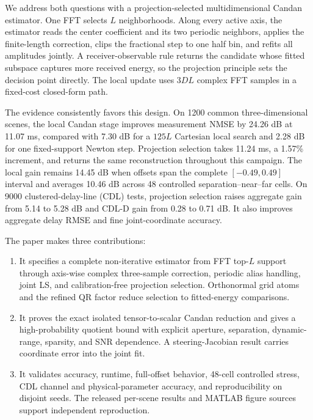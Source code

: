 We address both questions with a projection-selected multidimensional Candan estimator. One FFT selects $L$ neighborhoods. Along every active axis, the estimator reads the center coefficient and its two periodic neighbors, applies the finite-length correction, clips the fractional step to one half bin, and refits all amplitudes jointly. A receiver-observable rule returns the candidate whose fitted subspace captures more received energy, so the projection principle sets the decision point directly. The local update uses $3DL$ complex FFT samples in a fixed-cost closed-form path.

The evidence consistently favors this design. On 1200 common three-dimensional scenes, the local Candan stage improves measurement NMSE by 24.26 dB at 11.07 ms, compared with 7.30 dB for a $125L$ Cartesian local search and 2.28 dB for one fixed-support Newton step. Projection selection takes 11.24 ms, a 1.57\% increment, and returns the same reconstruction throughout this campaign. The local gain remains 14.45 dB when offsets span the complete $[-0.49,0.49]$ interval and averages 10.46 dB across 48 controlled separation--near--far cells. On 9000 clustered-delay-line (CDL) tests, projection selection raises aggregate gain from 5.14 to 5.28 dB and CDL-D gain from 0.28 to 0.71 dB. It also improves aggregate delay RMSE and fine joint-coordinate accuracy.

The paper makes three contributions:
\begin{enumerate}
  \item It specifies a complete non-iterative estimator from FFT top-$L$ support through axis-wise complex three-sample correction, periodic alias handling, joint LS, and calibration-free projection selection. Orthonormal grid atoms and the refined QR factor reduce selection to fitted-energy comparisons.
  \item It proves the exact isolated tensor-to-scalar Candan reduction and gives a high-probability quotient bound with explicit aperture, separation, dynamic-range, sparsity, and SNR dependence. A steering-Jacobian result carries coordinate error into the joint fit.
  \item It validates accuracy, runtime, full-offset behavior, 48-cell controlled stress, CDL channel and physical-parameter accuracy, and reproducibility on disjoint seeds. The released per-scene results and MATLAB figure sources support independent reproduction.
\end{enumerate}

